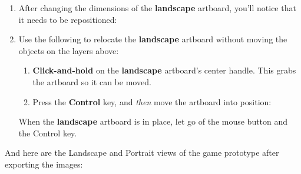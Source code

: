 \documentclass[../main.tex]{subfiles}
\begin{document}
\begin{enumerate}
  \item After changing the dimensions of the \textbf{landscape} artboard, you'll notice that it
    needs to be repositioned:

  \item Use the following to relocate the \textbf{landscape} artboard without moving the objects
    on the layers above:

    \begin{enumerate}
      \item \textbf{Click-and-hold} on the \textbf{landscape} artboard's center handle. This grabs
        the artboard so it can be moved.
      \item Press the \textbf{Control} key, and \textit{then} move the artboard into position:
    \end{enumerate}


    When the \textbf{landscape} artboard is in place, let go of the mouse button and the Control
    key.
\end{enumerate}

And here are the Landscape and Portrait views of the game prototype after exporting the images:

\end{document}
